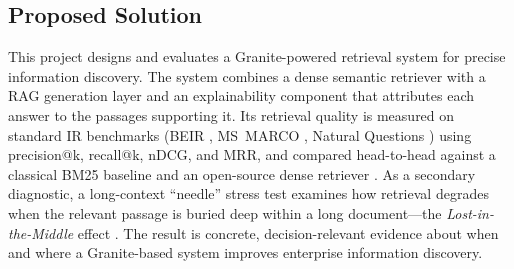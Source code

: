 \subsection{Proposed Solution}

This project designs and evaluates a Granite-powered retrieval system for precise
information discovery. The system combines a dense semantic retriever with a RAG
generation layer and an explainability component that attributes each answer to
the passages supporting it. Its retrieval quality is measured on standard IR
benchmarks (BEIR \parencite{thakur2021beir}, MS~MARCO \parencite{nguyen2016msmarco},
Natural Questions \parencite{kwiatkowski2019nq}) using precision@k, recall@k,
nDCG, and MRR, and compared head-to-head against a classical BM25 baseline
\parencite{robertson2009bm25} and an open-source dense retriever
\parencite{karpukhin2020dpr}. As a secondary diagnostic, a long-context
``needle'' stress test examines how retrieval degrades when the relevant passage
is buried deep within a long document---the \emph{Lost-in-the-Middle} effect
\parencite{liu2024lost}. The result is concrete, decision-relevant evidence about
when and where a Granite-based system improves enterprise information discovery.
